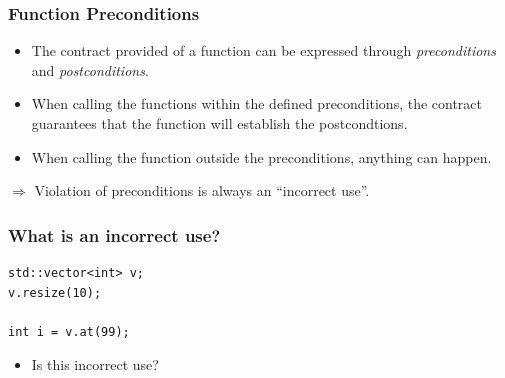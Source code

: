 \documentclass[aspectratio=169]{beamer}
\begin{document}
\begin{frame}
  \frametitle{Function Preconditions}
  
  \begin{itemize}
    \item The contract provided of a function can be expressed through \textit{preconditions} and \textit{postconditions}.
    \item When calling the functions within the defined preconditions, the contract guarantees that the function will establish the postcondtions.
    \item When calling the function outside the preconditions, anything can happen.
  \end{itemize}
  
  \vspace{20pt}
  
  $\Rightarrow$ Violation of preconditions is always an ``incorrect use''.
\end{frame}

\begin{frame}[fragile]
  \frametitle{What is an incorrect use?}
  
  \begin{lstlisting}[style=cpp20]
std::vector<int> v;
v.resize(10);

int i = v.at(99);
  \end{lstlisting}
  
  \vspace{20pt}
  
  \begin{itemize}
    \item Is this incorrect use?
  \end{itemize}
  
\end{frame}
\end{document}

